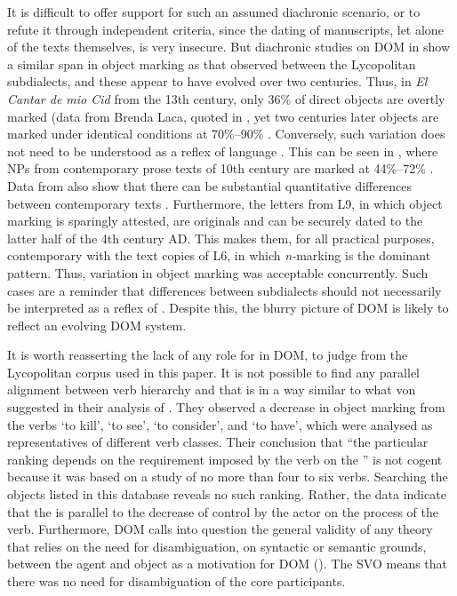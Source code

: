 \documentclass[output=paper]{LSP/langsci}
\begin{document}
It is difficult to offer support for such an assumed diachronic scenario, or to refute it through independent criteria, since the dating of manuscripts, let alone of the texts themselves, is very insecure. 
But diachronic studies on DOM in  show a similar span in object marking as that observed between the Lycopolitan subdialects, and these appear to have evolved over two centuries. 
Thus, in \textit{El Cantar de mio Cid} from the 13th century, only 36\% of  direct objects are overtly marked (data from Brenda Laca, quoted in \citealt[602]{vonHeusingeretal2011Affectedness}, yet two centuries later objects are marked under identical conditions at 70\%–90\% \citep[610]{vonHeusingeretal2011Affectedness}. 
Conversely, such variation does not need to be understood as a reflex of language . This can be seen in , where NPs from contemporary prose texts of 10th century are marked at 44\%–72\% \citep[248]{Sadler2002Pragmatic}. 
Data from  also show that there can be substantial quantitative differences between contemporary texts \citep[85, 119–120]{Delille1970Entwicklung}. 
Furthermore, the letters from L9, in which object marking is sparingly attested, are originals and can be securely dated to the latter half of the 4th century AD. 
This makes them, for all practical purposes, contemporary with the text copies of L6, in which \textit{n-}marking is the dominant pattern. 
Thus, variation in object marking was acceptable concurrently. Such cases are a reminder that differences between subdialects should not necessarily be interpreted as a reflex of . Despite this, the blurry picture of  DOM is likely to reflect an evolving DOM system. 

It is worth reasserting the lack of any role for  in  DOM, to judge from the Lycopolitan corpus used in this paper. 
It is not possible to find any parallel alignment between verb hierarchy and  that is in a way similar to what von \citet{vonHeusingeretal2007Differential} suggested in their analysis of . They observed a decrease in object marking from the verbs ‘to kill’, ‘to see’, ‘to consider’, and ‘to have’, which were analysed as representatives of different verb classes. Their conclusion that “the particular ranking depends on the  requirement imposed by the verb on the ” \citep[605]{vonHeusingeretal2011Affectedness} is not cogent because it was based on a study of no more than four to six verbs. 
Searching the  \vs {} objects listed in this database reveals no such  ranking. Rather, the  data indicate that the  is parallel to the decrease of control by the actor on the process of the verb. 
Furthermore,  DOM calls into question the general validity of any theory that relies on the need for disambiguation, on syntactic or semantic grounds, between the agent and object as a motivation for DOM (\eg \citealt{Aissen2003Differential,deSwart2005Resolution,Primus2012Animacy}). The  SVO means that there was no need for disambiguation of the core participants.
\end{document}
